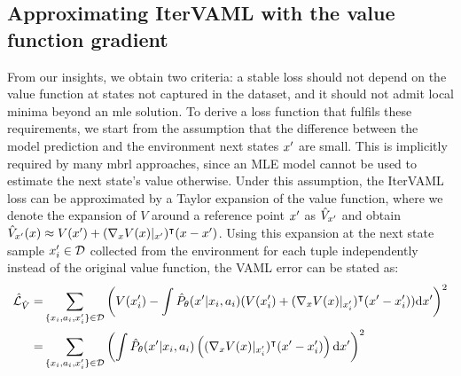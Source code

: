 
\subsection{Approximating IterVAML with the value function gradient}
From our insights, we obtain two criteria: a stable loss should not depend on the value function at states not captured in the dataset, and it should not admit local minima beyond an \ac{mle} solution.
To derive a loss function that fulfils these requirements, we start from the assumption that the difference between the model prediction and the environment next states $x'$ are small.
This is implicitly required by many \ac{mbrl} approaches, since an MLE model cannot be used to estimate the next state's value otherwise. 
Under this assumption, the IterVAML loss can be approximated by a Taylor expansion of the value function, where we denote the expansion of $V$ around a reference point $x'$ as $\hat{V}_{x'}$ and obtain $\hat{V}_{x'}(x) \approx V(x') + (\nabla_x V(x)|_{x'})^\intercal (x - x')$.
Using this expansion at the next state sample $x'_i \in \mathcal{D}$ collected from the environment for each tuple independently instead of the original value function, the VAML error can be stated as:
\begin{align}
    \hat{\mathcal{L}}_{\hat{V}}=&\sum_{\{x_i,a_i,x'_i\}\in\mathcal{D}}{\left(V(x'_i) - \int \hat{P}_\theta(x'|x_i,a_i) (V(x'_i) + (\nabla_x V(x)|_{x'_i})^\intercal (x' - x'_i)) \mathrm{d}x'\right)^2}\\
    =&\sum_{\{x_i,a_i,x'_i\}\in\mathcal{D}} {\left(\int \hat{P}_\theta(x'|x_i,a_i) \left((\nabla_x V(x)|_{x'_i})^\intercal(x' - x'_i) \right) \mathrm{d}x'\right)^2}
\end{align}

